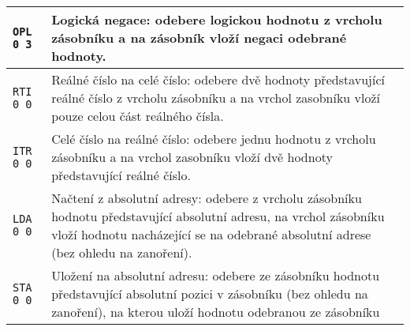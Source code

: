 \documentclass{article}
\begin{document}
\begin{longtable}{|l| p{10cm}|}
		\rule{0pt}{4ex} \texttt{OPL 0 3} & Logická negace: odebere logickou hodnotu z vrcholu zásobníku a na zásobník vloží negaci odebrané hodnoty. \\ \hline
		
		\rule{0pt}{3ex} \texttt{RTI 0 0} & Reálné číslo na celé číslo: odebere dvě hodnoty představující reálné číslo z vrcholu zásobníku a na vrchol zasobníku vloží pouze celou část reálného čísla. \\ \hline
		
		\rule{0pt}{3ex} \texttt{ITR 0 0} & Celé číslo na reálné číslo: odebere jednu hodnotu z vrcholu zásobníku a na vrchol zasobníku vloží dvě hodnoty představující reálné číslo. \\ \hline
		
		\rule{0pt}{3ex} \texttt{LDA 0 0} & Načtení z absolutní adresy: odebere z vrcholu zásobníku hodnotu představující absolutní adresu, na vrchol zásobníku vloží hodnotu nacházející se na odebrané absolutní adrese (bez ohledu na zanoření). \\ \hline
		
		\rule{0pt}{3ex} \texttt{STA 0 0} & Uložení na absolutní adresu: odebere ze zásobníku hodnotu představující absolutní pozici v zásobníku (bez ohledu na zanoření), na kterou uloží hodnotu odebranou ze zásobníku \\ \hline
	\end{longtable}
\end{document}
